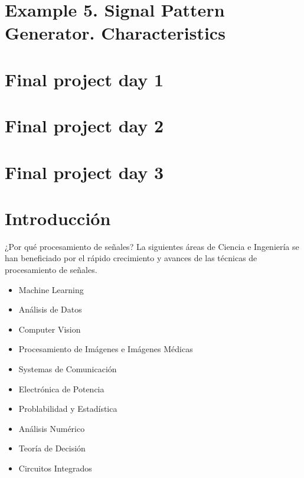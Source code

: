 \documentclass[11pt]{beamer}
\begin{document}
	\section{Example 5. Signal Pattern Generator. Characteristics}
	\begin{frame}
	\end{frame}
	\section{Final project day 1}
	\begin{frame}
	\end{frame}
	\section{Final project day 2}
	\begin{frame}
	\end{frame}
	
	\section{Final project day 3}
	\begin{frame}
	\end{frame}



\section{Introducción}

\begin{frame}{¿Por qué procesamiento de señales?}
	La siguientes áreas de Ciencia e Ingeniería	se han beneficiado por el rápido crecimiento y avances de las técnicas de procesamiento de señales. 
	\vspace{0.2cm}
	\begin{itemize}
		\item Machine Learning
		\item Análisis de Datos
		\item Computer Vision
		\item Procesamiento de Imágenes e Imágenes Médicas
		\item Systemas de Comunicación
		\item Electrónica de Potencia
		\item Problabilidad y Estadística
		\item Análisis Numérico
		\item Teoría de Decisión
		\item Circuitos Integrados
	\end{itemize}
\end{frame}
\end{document}
